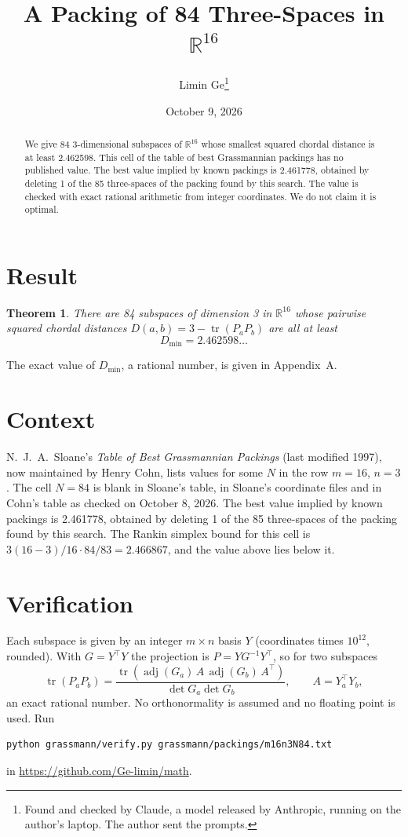 \documentclass[11pt,a4paper]{article}
\title{A Packing of 84 Three-Spaces in $\mathbb{R}^{16}$}
\author{Limin Ge\thanks{Found and checked by Claude, a model released by Anthropic, running on the author's laptop. The author sent the prompts.}}
\date{October 9, 2026}
\newtheorem*{theorem}{Theorem}
\begin{document}
\maketitle
\begin{abstract}
We give 84 3-dimensional subspaces of $\mathbb{R}^{16}$ whose smallest squared chordal distance is at least 2.462598. This cell of the table of best Grassmannian packings has no published value. The best value implied by known packings is 2.461778, obtained by deleting 1 of the 85 three-spaces of the packing found by this search. The value is checked with exact rational arithmetic from integer coordinates. We do not claim it is optimal.
\end{abstract}

\section{Result}
\begin{theorem}
There are 84 subspaces of dimension 3 in $\mathbb{R}^{16}$ whose pairwise squared chordal distances $D(a,b) = 3 - \operatorname{tr}(P_aP_b)$ are all at least
\[ D_{\min} = 2.462598\ldots \]
\end{theorem}
The exact value of $D_{\min}$, a rational number, is given in Appendix~A.


\section{Context}
N.~J.~A.~Sloane's \emph{Table of Best Grassmannian Packings} (last modified 1997), now maintained by Henry Cohn, lists values for some $N$ in the row $m=16$, $n=3$. The cell $N=84$ is blank in Sloane's table, in Sloane's coordinate files and in Cohn's table as checked on October 8, 2026. The best value implied by known packings is 2.461778, obtained by deleting 1 of the 85 three-spaces of the packing found by this search. The Rankin simplex bound for this cell is $3(16-3)/16\cdot 84/83 = 2.466867$, and the value above lies below it.


\section{Verification}
Each subspace is given by an integer $m\times n$ basis $Y$ (coordinates times $10^{12}$, rounded). With $G=Y^\top Y$ the projection is $P=YG^{-1}Y^\top$, so for two subspaces
\[ \operatorname{tr}(P_aP_b)=\frac{\operatorname{tr}(\operatorname{adj}(G_a)\,A\,\operatorname{adj}(G_b)\,A^\top)}{\det G_a\det G_b},\qquad A=Y_a^\top Y_b, \]
an exact rational number. No orthonormality is assumed and no floating point is used. Run
\begin{verbatim}
python grassmann/verify.py grassmann/packings/m16n3N84.txt
\end{verbatim}
in \url{https://github.com/Ge-limin/math}.
\end{document}
